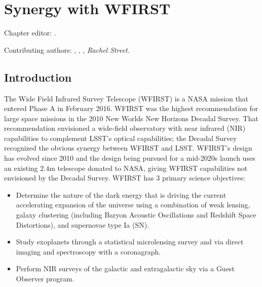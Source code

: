 \chapter[Synergy with WFIRST]{Synergy with WFIRST}
\def\chpname{wfirst}\label{chp:\chpname}

Chapter editor:
.

Contributing authors:
,
,
,
{\it Rachel Street}.


\section{Introduction}
\label{sec:wfirst:intro}


The Wide Field Infrared Survey Telescope (WFIRST) is a NASA mission that
entered Phase A in February 2016.  WFIRST was the highest recommendation
for large space missions in the 2010 New Worlds New Horizons Decadal
Survey.  That recommendation envisioned a wide-field observatory with
near infrared (NIR) capabilities to complement LSST's optical
capabilities; the Decadal Survey recognized the obvious synergy between
WFIRST and LSST.  WFIRST's design has evolved since 2010 and the design
being pursued for a mid-2020s launch uses an existing $2.4$m telescope
donated to NASA, giving WFIRST capabilities not envisioned by the
Decadal Survey.  WFIRST has 3 primary science objectives:

\begin{itemize}
\item Determine the nature of the dark energy that is driving the
current accelerating expansion of the universe using a combination of
weak lensing, galaxy clustering (including Baryon Acoustic Oscillations
and Redshift Space Distortions), and supernovae type Ia (SN).
\item Study exoplanets through a statistical microlensing survey and via
direct imaging and spectroscopy with a coronagraph.
\item Perform NIR surveys of the galactic and extragalactic sky via a
Guest Observer program.
\end{itemize}

